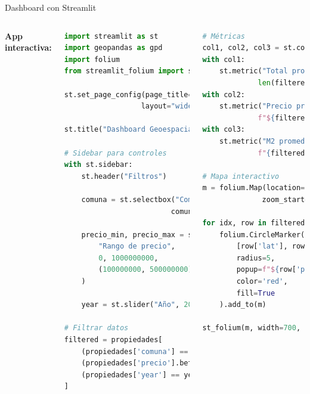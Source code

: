\documentclass[10pt,aspectratio=169]{beamer}
\begin{document}
\begin{frame}[fragile]{Dashboard con Streamlit}
    \begin{columns}[T]
        \textbf{App interactiva:}
        \begin{lstlisting}[language=Python]
import streamlit as st
import geopandas as gpd
import folium
from streamlit_folium import st_folium

st.set_page_config(page_title="GeoAnalytics", 
                  layout="wide")

st.title("Dashboard Geoespacial")

# Sidebar para controles
with st.sidebar:
    st.header("Filtros")
    
    comuna = st.selectbox("Comuna", 
                         comunas_gdf['nombre'].unique())
    
    precio_min, precio_max = st.slider(
        "Rango de precio",
        0, 1000000000,
        (100000000, 500000000)
    )
    
    year = st.slider("Año", 2020, 2024, 2024)

# Filtrar datos
filtered = propiedades[
    (propiedades['comuna'] == comuna) &
    (propiedades['precio'].between(precio_min, precio_max)) &
    (propiedades['year'] == year)
]
        \end{lstlisting}
        
        \begin{lstlisting}[language=Python]
# Métricas
col1, col2, col3 = st.columns(3)
with col1:
    st.metric("Total propiedades", 
             len(filtered))
with col2:
    st.metric("Precio promedio", 
             f"${filtered['precio'].mean():,.0f}")
with col3:
    st.metric("M2 promedio", 
             f"{filtered['m2'].mean():.1f}")

# Mapa interactivo
m = folium.Map(location=[-33.45, -70.65], 
              zoom_start=11)

for idx, row in filtered.iterrows():
    folium.CircleMarker(
        [row['lat'], row['lon']],
        radius=5,
        popup=f"${row['precio']:,.0f}",
        color='red',
        fill=True
    ).add_to(m)

st_folium(m, width=700, height=450)
        \end{lstlisting}
    \end{columns}
\end{frame}
\end{document}
